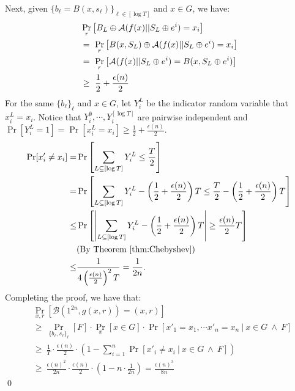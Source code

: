 Next, given $\{ b_\ell = B(x,s_\ell) \}_{\ell \in [\log T]}$ and $x\in G$, we have:
\begin{align*}
&\Pr_{r} \left[  B_L \oplus \mathcal{A}(f(x) || S_L \oplus e^i) = x_i \right] \\
&=~ \Pr_{r} \left[ B(x,S_L) \oplus \mathcal{A}(f(x) || S_L \oplus e^i) = x_i \right]\\
&=~ \Pr_{r} \left[ \mathcal{A}(f(x) || S_L \oplus e^i) =  B(x,S_L \oplus e^i) \right]\\
&\geq~ \frac{1}{2} + \frac{\epsilon(n)}{2}
\end{align*}
For the same $\{ b_\ell \}_\ell$ and $x\in G$, let $Y_i^L$ be the indicator random variable that $x_i^L = x_i$.
Notice that $Y_i^\emptyset, \cdots, Y_i^{[\log T]}$ are pairwise independent and $\Pr[Y_i^L=1] = \Pr[x_i^L = x_i] \geq \frac{1}{2} + \frac{\epsilon(n)}{2}$.
\begin{align*}
\Pr[x'_i \neq x_i] =& \Pr\left[\sum_{L \subseteq [\log T]} Y_i^L \leq \frac{T}{2} \right]\\
=& \Pr\left[\sum_{L \subseteq [\log T]} Y_i^L - \left(\frac{1}{2} +  \frac{\epsilon(n)}{2} \right)T \leq \frac{T}{2} - \left(\frac{1}{2} +  \frac{\epsilon(n)}{2} \right)T \right]\\
\leq& \Pr\left[ \left| \sum_{L \subseteq [\log T]} Y_i^L - \left(\frac{1}{2} +  \frac{\epsilon(n)}{2} \right)T \right| \geq \frac{\epsilon(n)}{2} T \right]\\
& \text{(By Theorem~\ref{thm:Chebyshev})}\\
\leq& \frac{1}{4\left( \frac{\epsilon(n)}{2}\right)^2T} = \frac{1}{2n}.
\end{align*}
Completing the proof, we have that:
\begin{align*}
& \Pr_{x,r}[\mathcal{B}(1^{2n}, g(x,r)) = (x,r)]\\
&\geq~  \Pr_{\{ b_\ell, s_\ell \}_\ell}\left[ F \right] \cdot  \Pr_x [x \in G] \cdot \Pr[x'_1 = x_1, \cdots x'_n = x_n ~|~ x \in G ~\wedge~ F]\\
&\geq~ \frac{1}{T} \cdot \frac{\epsilon(n)}{2} \cdot \left(1- \sum_{i=1}^n\Pr[x'_i \neq x_i ~|~  x \in G ~\wedge~ F]\right)\\
&\geq~ \frac{\epsilon(n)^2}{2n} \cdot \frac{\epsilon(n)}{2} \cdot \left(1- n \cdot\frac{1}{2n} \right) =  \frac{\epsilon(n)^3}{8n}
\end{align*}
\qed



